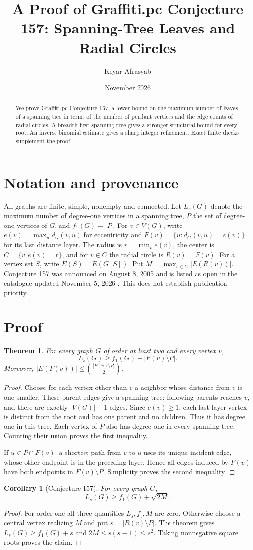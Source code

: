 \documentclass[11pt]{article}
\title{A Proof of Graffiti.pc Conjecture 157: Spanning-Tree Leaves and Radial Circles}
\author{Koyar Afrasyab}
\date{November 2026}
\newtheorem{theorem}{Theorem}
\newtheorem{corollary}{Corollary}
\begin{document}
\maketitle
\begin{abstract}
We prove Graffiti.pc Conjecture 157, a lower bound on the maximum number of leaves of a spanning tree in terms of the number of pendant vertices and the edge counts of radial circles. A breadth-first spanning tree gives a stronger structural bound for every root. An inverse binomial estimate gives a sharp integer refinement. Exact finite checks supplement the proof.
\end{abstract}
\section{Notation and provenance}
All graphs are finite, simple, nonempty and connected. Let $L_s(G)$ denote the maximum number of degree-one vertices in a spanning tree, $P$ the set of degree-one vertices of $G$, and $f_1(G)=|P|$. For $v\in V(G)$, write $e(v)=\max_u d_G(v,u)$ for eccentricity and $F(v)=\{u:d_G(v,u)=e(v)\}$ for its last distance layer. The radius is $r=\min_v e(v)$, the center is $C=\{v:e(v)=r\}$, and for $v\in C$ the radial circle is $R(v)=F(v)$. For a vertex set $S$, write $E(S)=E(G[S])$. Put $M=\max_{v\in C}|E(R(v))|$. Conjecture 157 was announced on August 8, 2005 and is listed as open in the catalogue updated November 5, 2026 \cite{wow}. This does not establish publication priority.
\section{Proof}
\begin{theorem}
For every graph $G$ of order at least two and every vertex $v$,
\[
 L_s(G)\ge f_1(G)+|F(v)\setminus P|.
\]
Moreover, $|E(F(v))|\le \binom{|F(v)\setminus P|}{2}$.
\end{theorem}
\begin{proof}
Choose for each vertex other than $v$ a neighbor whose distance from $v$ is one smaller. These parent edges give a spanning tree: following parents reaches $v$, and there are exactly $|V(G)|-1$ edges. Since $e(v)\ge1$, each last-layer vertex is distinct from the root and has one parent and no children. Thus it has degree one in this tree. Each vertex of $P$ also has degree one in every spanning tree. Counting their union proves the first inequality.

If $u\in P\cap F(v)$, a shortest path from $v$ to $u$ uses its unique incident edge, whose other endpoint is in the preceding layer. Hence all edges induced by $F(v)$ have both endpoints in $F(v)\setminus P$. Simplicity proves the second inequality.
\end{proof}
\begin{corollary}[Conjecture 157]
For every graph $G$,
\[
 L_s(G)\ge f_1(G)+\sqrt{2M}.
\]
\end{corollary}
\begin{proof}
For order one all three quantities $L_s,f_1,M$ are zero. Otherwise choose a central vertex realizing $M$ and put $s=|R(v)\setminus P|$. The theorem gives $L_s(G)\ge f_1(G)+s$ and $2M\le s(s-1)\le s^2$. Taking nonnegative square roots proves the claim.
\end{proof}
\end{document}
